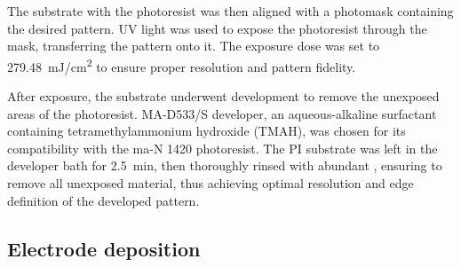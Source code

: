 The substrate with the photoresist was then aligned with a photomask containing
the desired pattern. UV light was used to expose the photoresist through the
mask, transferring the pattern onto it. The exposure dose was set to
\SI{279.48}{\mJ/\cm\squared} to ensure proper resolution and pattern fidelity.

After exposure, the substrate underwent development to remove the unexposed
areas of the photoresist. MA-D533/S developer, an aqueous-alkaline surfactant
containing tetramethylammonium hydroxide (TMAH), was chosen for its
compatibility with the ma-N 1420 photoresist. The PI substrate was left in the
developer bath for \SI{2.5}{\minute}, then thoroughly rinsed with abundant
, ensuring to remove all unexposed material, thus achieving optimal
resolution and edge definition of the developed pattern.

\subsection{Electrode deposition}
\label{sec:eavporation}

